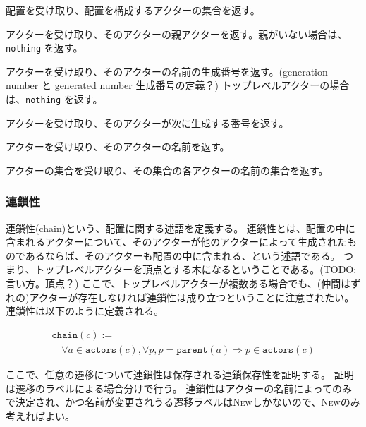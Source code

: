 \begin{description}[style=nextline,leftmargin=12pt,parsep=0pt]
\item[\texttt{actors} $: \textit{Configuration} \rightarrow \textit{Set(Actor)}$]
  配置を受け取り、配置を構成するアクターの集合を返す。
\item[\texttt{parent} $: \textit{Actor} \rightarrow \textit{Actor}$]
  アクターを受け取り、そのアクターの親アクターを返す。親がいない場合は、\texttt{nothing} を返す。
\item[\texttt{gen\_number} $: \textit{Actor} \rightarrow \mathbb{N}$]
  アクターを受け取り、そのアクターの名前の生成番号を返す。(generation number と generated number 生成番号の定義？)
  トップレベルアクターの場合は、\texttt{nothing} を返す。
\item[\texttt{next\_number} $: \textit{Actor} \rightarrow \mathbb{N}$]
  アクターを受け取り、そのアクターが次に生成する番号を返す。
\item[\texttt{name} $: \textit{Actor} \rightarrow \textit{Name}$]
  アクターを受け取り、そのアクターの名前を返す。
\item[\texttt{names} $: \textit{Set(Actor)} \rightarrow \textit{Set(Name)}$]
  アクターの集合を受け取り、その集合の各アクターの名前の集合を返す。
\end{description}

\subsubsection{連鎖性}

連鎖性(chain)という、配置に関する述語を定義する。
連鎖性とは、配置の中に含まれるアクターについて、そのアクターが他のアクターによって生成されたものであるならば、そのアクターも配置の中に含まれる、という述語である。
つまり、トップレベルアクターを頂点とする木になるということである。(TODO:言い方。頂点？)
ここで、トップレベルアクターが複数ある場合でも、(仲間はずれの)アクターが存在しなければ連鎖性は成り立つということに注意されたい。
連鎖性は以下のように定義される。

\begin{displaymath}
  \begin{array}{l}
    \texttt{chain}(c) := \\
    \quad \forall a \in \texttt{actors}(c), \forall p, p = \texttt{parent}(a) \Rightarrow p \in \texttt{actors}(c)
  \end{array}
\end{displaymath}

ここで、任意の遷移について連鎖性は保存される連鎖保存性を証明する。
証明は遷移のラベルによる場合分けで行う。
連鎖性はアクターの名前によってのみで決定され、かつ名前が変更されうる遷移ラベルは\textsc{New}しかないので、\textsc{New}のみ考えればよい。

